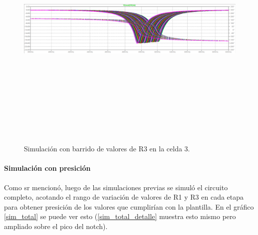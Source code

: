  \begin{figure}[H] %
	\centering	\includegraphics[width=12cm,height=12cm,keepaspectratio]{../EJ4/graficos/etapa3_R3.png}
	\caption{Simulaci\'on con barrido de valores de R3 en la celda 3.}
	\label{celda3_r3}
\end{figure}

\paragraph{Simulaci\'on con presici\'on}
Como sr mencion\'o, luego de las simulaciones previas se simul\'o el circuito completo, acotando el rango de variaci\'on de valores de R1 y R3 en cada etapa para obtener presici\'on de los valores que cumplir\'ian con la plantilla. En el gr\'afico \ref{sim_total} se puede ver esto (\ref{sim_total_detalle} muestra esto mismo pero ampliado sobre el pico del notch).

